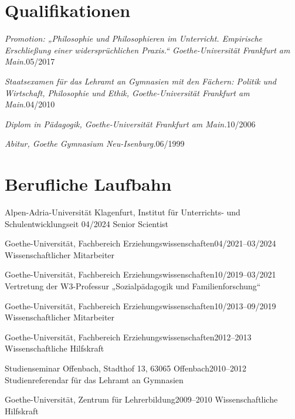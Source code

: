 \section{Qualifikationen}
  \vspace{3pt}
  \resumeSubHeadingListStart
    \resumeProjectHeading
      {\textit{Promotion: „Philosophie und Philosophieren im Unterricht. Empirische Erschließung einer widersprüchlichen Praxis.“ Goethe-Universität Frankfurt am Main.}}{05/2017}


        \resumeProjectHeading
      {\textit{Staatsexamen für das Lehramt an Gymnasien mit den Fächern: Politik und Wirtschaft, Philosophie und Ethik, Goethe-Universität Frankfurt am Main.}}{04/2010}


        \resumeProjectHeading
      {\textit{Diplom in Pädagogik, Goethe-Universität Frankfurt am Main.}}{10/2006}


    \resumeProjectHeading
      {\textit{Abitur, Goethe Gymnasium Neu-Isenburg.}}{06/1999}
  \resumeSubHeadingListEnd


\section{Berufliche Laufbahn}
  \vspace{3pt}
  \resumeSubHeadingListStart
\resumeSubheading
      {Alpen-Adria-Universität Klagenfurt, Institut für Unterrichts- und Schulentwicklung}{seit 04/2024}
      {Senior Scientist}{}

    \resumeSubheading
      {Goethe-Universität, Fachbereich Erziehungswissenschaften}{04/2021–03/2024}
      {Wissenschaftlicher Mitarbeiter}{}

    \resumeSubheading
      {Goethe-Universität, Fachbereich Erziehungswissenschaften}{10/2019–03/2021}
      {Vertretung der W3-Professur „Sozialpädagogik und Familienforschung“}{}

    \resumeSubheading
      {Goethe-Universität, Fachbereich Erziehungswissenschaften}{10/2013–09/2019}
      {Wissenschaftlicher Mitarbeiter}{}

    \resumeSubheading
      {Goethe-Universität, Fachbereich Erziehungswissenschaften}{2012–2013}
      {Wissenschaftliche Hilfskraft}{}

    \resumeSubheading
      {Studienseminar Offenbach, Stadthof 13, 63065 Offenbach}{2010–2012}
      {Studienreferendar für das Lehramt an Gymnasien}{}

    \resumeSubheading
      {Goethe-Universität, Zentrum für Lehrerbildung}{2009–2010}
      {Wissenschaftliche Hilfskraft}{}

